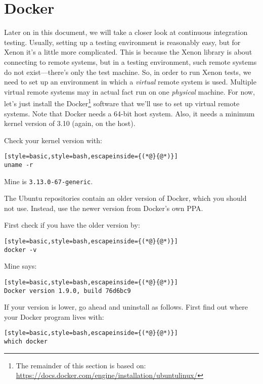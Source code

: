 \section{Docker}

Later on in this document, we will take a closer look at continuous integration testing. Usually, setting up a testing environment is reasonably easy, but for Xenon it's a little more complicated. This is because the Xenon library is about connecting to remote systems, but in a testing environment, such remote systems do not exist---there's only the test machine. So, in order to run Xenon tests, we need to set up an environment in which a \textit{virtual} remote system is used. Multiple virtual remote systems may in actual fact run on one \textit{physical} machine. For now, let's just install the Docker\footnote{The remainder of this section is based on: \url{https://docs.docker.com/engine/installation/ubuntulinux/}} software that we'll use to set up virtual remote systems. Note that Docker needs a 64-bit host system. Also, it needs a minimum kernel version of 3.10 (again, on the host).

Check your kernel version with:
\begin{lstlisting}[style=basic,style=bash,escapeinside={(*@}{@*)}]
uname -r
\end{lstlisting}
Mine is \texttt{3.13.0-67-generic}.

The Ubuntu repositories contain an older version of Docker, which you should not use. Instead, use the newer version from Docker's own PPA.

First check if you have the older version by:
\begin{lstlisting}[style=basic,style=bash,escapeinside={(*@}{@*)}]
docker -v
\end{lstlisting}
Mine says:
\begin{lstlisting}[style=basic,style=bash,escapeinside={(*@}{@*)}]
Docker version 1.9.0, build 76d6bc9
\end{lstlisting}

If your version is lower, go ahead and uninstall as follows. First find out where your Docker program lives with:
\begin{lstlisting}[style=basic,style=bash,escapeinside={(*@}{@*)}]
which docker
\end{lstlisting}

